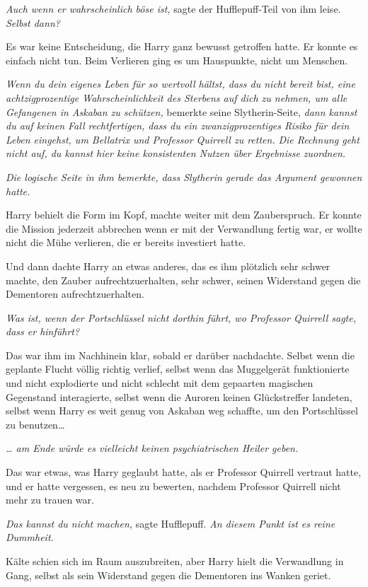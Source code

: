{\emph{Auch wenn er wahrscheinlich böse ist,} sagte der Hufflepuff-Teil von ihm leise. \emph{Selbst dann?}

Es war keine Entscheidung, die Harry ganz bewusst getroffen hatte. Er konnte es einfach nicht tun. Beim Verlieren ging es um Hauspunkte, nicht um Menschen.

\emph{Wenn du dein eigenes Leben für so wertvoll hältst, dass du nicht bereit bist, eine achtzigprozentige Wahrscheinlichkeit des Sterbens auf dich zu nehmen, um alle Gefangenen in Askaban zu schützen,} bemerkte seine Slytherin-Seite, \emph{dann kannst du auf keinen Fall rechtfertigen, dass du ein zwanzigprozentiges Risiko für dein Leben eingehst, um Bellatrix und Professor Quirrell zu retten.} \emph{Die Rechnung geht nicht auf, du kannst hier keine konsistenten Nutzen über Ergebnisse zuordnen.}

\emph{Die logische Seite in ihm bemerkte, dass Slytherin gerade das Argument gewonnen hatte.}

Harry behielt die Form im Kopf, machte weiter mit dem Zauberspruch. Er konnte die Mission jederzeit abbrechen wenn er mit der Verwandlung fertig war, er wollte nicht die Mühe verlieren, die er bereits investiert hatte.

Und dann dachte Harry an etwas anderes, das es ihm plötzlich sehr schwer machte, den Zauber aufrechtzuerhalten, sehr schwer, seinen Widerstand gegen die Dementoren aufrechtzuerhalten.

\emph{Was ist, wenn der Portschlüssel nicht dorthin führt, wo Professor Quirrell sagte, dass er hinführt?}

Das war ihm im Nachhinein klar, sobald er darüber nachdachte. Selbst wenn die geplante Flucht völlig richtig verlief, selbst wenn das Muggelgerät funktionierte und nicht explodierte und nicht schlecht mit dem gepaarten magischen Gegenstand interagierte, selbst wenn die Auroren keinen Glückstreffer landeten, selbst wenn Harry es weit genug von Askaban weg schaffte, um den Portschlüssel zu benutzen…

\emph{… am Ende würde es vielleicht keinen psychiatrischen Heiler geben.}

Das war etwas, was Harry geglaubt hatte, als er Professor Quirrell vertraut hatte, und er hatte vergessen, es neu zu bewerten, nachdem Professor Quirrell nicht mehr zu trauen war.

\emph{Das kannst du nicht machen,} sagte Hufflepuff. \emph{An diesem Punkt ist es reine Dummheit.}

Kälte schien sich im Raum auszubreiten, aber Harry hielt die Verwandlung in Gang, selbst als sein Widerstand gegen die Dementoren ins Wanken geriet.

}
